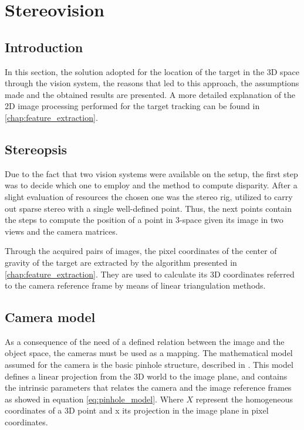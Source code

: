 
\chapter{Stereovision} %
\label{chap:stereopsis}

\section{Introduction}
In this section, the solution adopted for the location of the target in the 3D space through the vision system, the reasons that led to this approach, the assumptions made and the obtained results are presented.
A more detailed explanation of the 2D image processing performed for the target tracking can be found in \ref{chap:feature_extraction}.

\section{Stereopsis}
Due to the fact that two vision systems were available on the setup, the first step was to decide which one to employ and the method to compute disparity.
After a slight evaluation of resources the chosen one was the stereo rig, utilized to carry out sparse stereo with a single well-defined point.
Thus, the next points contain the steps to compute the position of a point in 3-space given its image in two views and the camera matrices.

Through the acquired pairs of images, the pixel coordinates of the center of gravity of the target are extracted by the algorithm presented in \ref{chap:feature_extraction}.
They are used to calculate its 3D coordinates referred to the camera reference frame by means of linear triangulation methods.

\section{Camera model}
As a consequence of the need of a defined relation between the image and the object space, the cameras must be used as a mapping.
The mathematical model assumed for the camera is the basic pinhole structure, described in \cite{Hartley}.
This model defines a linear projection from the 3D world to the image plane, and contains the intrinsic parameters that relates the camera and the image reference frames as showed in equation \eqref{eq:pinhole_model}. Where $X$ represent the homogeneous coordinates of a 3D point and x its projection in the image plane in pixel coordinates.

